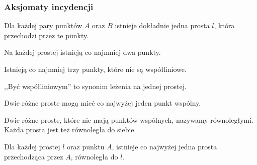 %

\subsubsection{Aksjomaty incydencji}
\begin{axiom}[incydencji, I1]
    Dla każdej pary punktów $A$ oraz $B$ istnieje dokładnie jedna prosta $l$, która przechodzi przez te punkty.
\end{axiom}

\begin{axiom}[incydencji, I2]
    Na każdej prostej istnieją co najmniej dwa punkty.
\end{axiom}

\begin{axiom}[incydencji, I3]
    Istnieją co najmniej trzy punkty, które nie są współliniowe.
\end{axiom}

,,Być współliniowym'' to synonim leżenia na jednej prostej.

\begin{proposition}
    Dwie różne proste mogą mieć co najwyżej jeden punkt wspólny.
\end{proposition}

\begin{definition}
    Dwie różne proste, które nie mają punktów wspólnych, nazywamy równoległymi.
    Każda prosta jest też równoległa do siebie.
\end{definition}

\begin{axiom}[Playfaira, P]
    Dla każdej prostej $l$ oraz punktu $A$, istnieje co najwyżej jedna prosta przechodząca przez $A$, równoległa do $l$.
\end{axiom}

